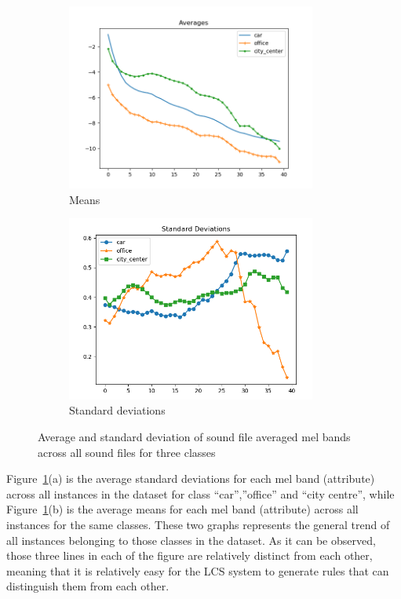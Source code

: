\documentclass[11pt]{article}
\begin{document}
\begin{figure}[!htbp]
	\centering
	\begin{subfigure}[t]{0.48\textwidth}
		\centering
		\includegraphics[width=0.9\textwidth]{yiyang_figures/Figure_1.png}
		\caption{Means}
	\end{subfigure}
	\begin{subfigure}[t]{0.48\textwidth}
		\centering
		\includegraphics[width=0.9\textwidth]{yiyang_figures/3_class_std.png}
		\caption{Standard deviations}
	\end{subfigure}
	\caption{Average and standard deviation of sound file averaged mel bands across all sound files for three classes}
	\label{fig:avgAndStd3}
\end{figure}

Figure~\ref{fig:avgAndStd3}(a) is the average standard deviations for each mel band (attribute) across all instances in the dataset for class ``car'',''office'' and ``city centre'', while Figure~\ref{fig:avgAndStd3}(b) is the average means for each mel band (attribute) across all instances for the same classes.  These two graphs represents the general trend of all instances belonging to those classes in the dataset.  As it can be observed, those three lines  in each of the figure are relatively distinct from each other, meaning that it is relatively easy for the LCS system to generate rules that can distinguish them from each other.
\end{document}
